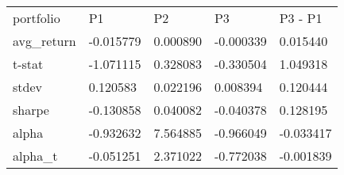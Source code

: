 \begin{tabular}{lllll}
\toprule
\midrule
portfolio & P1 & P2 & P3 & P3 - P1 \\
avg_return & -0.015779 & 0.000890 & -0.000339 & 0.015440 \\
t-stat & -1.071115 & 0.328083 & -0.330504 & 1.049318 \\
stdev & 0.120583 & 0.022196 & 0.008394 & 0.120444 \\
sharpe & -0.130858 & 0.040082 & -0.040378 & 0.128195 \\
alpha & -0.932632 & 7.564885 & -0.966049 & -0.033417 \\
alpha_t & -0.051251 & 2.371022 & -0.772038 & -0.001839 \\
\bottomrule
\end{tabular}
